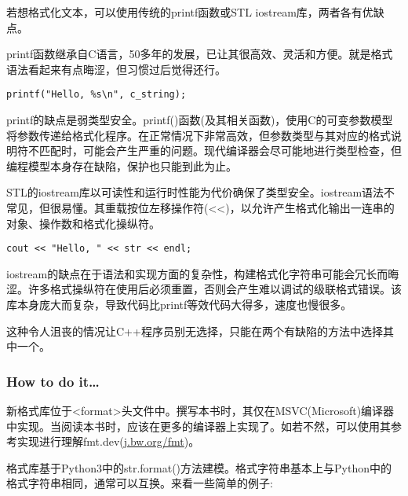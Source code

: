 
若想格式化文本，可以使用传统的printf函数或STL iostream库，两者各有优缺点。

printf函数继承自C语言，50多年的发展，已让其很高效、灵活和方便。就是格式语法看起来有点晦涩，但习惯过后觉得还行。

\begin{lstlisting}[style=styleCXX]
printf("Hello, %s\n", c_string);
\end{lstlisting}

printf的缺点是弱类型安全。printf()函数(及其相关函数)，使用C的可变参数模型将参数传递给格式化程序。在正常情况下非常高效，但参数类型与其对应的格式说明符不匹配时，可能会产生严重的问题。现代编译器会尽可能地进行类型检查，但编程模型本身存在缺陷，保护也只能到此为止。

STL的iostream库以可读性和运行时性能为代价确保了类型安全。iostream语法不常见，但很易懂。其重载按位左移操作符(<<)，以允许产生格式化输出一连串的对象、操作数和格式化操纵符。

\begin{lstlisting}[style=styleCXX]
cout << "Hello, " << str << endl;
\end{lstlisting}

iostream的缺点在于语法和实现方面的复杂性，构建格式化字符串可能会冗长而晦涩。许多格式操纵符在使用后必须重置，否则会产生难以调试的级联格式错误。该库本身庞大而复杂，导致代码比printf等效代码大得多，速度也慢很多。

这种令人沮丧的情况让C++程序员别无选择，只能在两个有缺陷的方法中选择其中一个。

\subsubsection{How to do it…}

新格式库位于<format>头文件中。撰写本书时，其仅在MSVC(Microsoft)编译器中实现。当阅读本书时，应该在更多的编译器上实现了。如若不然，可以使用其参考实现进行理解fmt.dev(\url{j.bw.org/fmt})。

格式库基于Python3中的str.format()方法建模。格式字符串基本上与Python中的格式字符串相同，通常可以互换。来看一些简单的例子:

